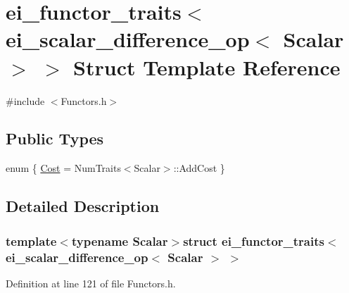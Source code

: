 \hypertarget{structei__functor__traits_3_01ei__scalar__difference__op_3_01_scalar_01_4_01_4}{\section{ei\-\_\-functor\-\_\-traits$<$ ei\-\_\-scalar\-\_\-difference\-\_\-op$<$ Scalar $>$ $>$ Struct Template Reference}
\label{structei__functor__traits_3_01ei__scalar__difference__op_3_01_scalar_01_4_01_4}
}


{\ttfamily \#include $<$Functors.\-h$>$}

\subsection*{Public Types}
\begin{DoxyCompactItemize}
\item 
enum \{ \hyperlink{structei__functor__traits_3_01ei__scalar__difference__op_3_01_scalar_01_4_01_4_a1abde76977b528cb26e46c666d6e3c47a78c883c6e5c52a4032c9f29279e0c9fa}{Cost} = Num\-Traits$<$Scalar$>$\-:\-:Add\-Cost
 \}
\end{DoxyCompactItemize}


\subsection{Detailed Description}
\subsubsection*{template$<$typename Scalar$>$struct ei\-\_\-functor\-\_\-traits$<$ ei\-\_\-scalar\-\_\-difference\-\_\-op$<$ Scalar $>$ $>$}



Definition at line 121 of file Functors.\-h.



